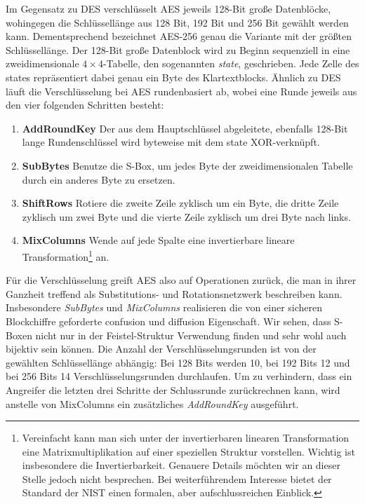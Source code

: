 Im Gegensatz zu DES verschlüsselt AES jeweils 128-Bit große Datenblöcke,
wohingegen die Schlüssellänge aus 128 Bit, 192 Bit und 256 Bit gewählt
werden kann. Dementsprechend bezeichnet AES-256 genau die Variante mit
der größten Schlüssellänge. Der 128-Bit große Datenblock wird zu Beginn
sequenziell in eine zweidimensionale $4 \times 4$-Tabelle, den
sogenannten \emph{state}, geschrieben. Jede Zelle des states
repräsentiert dabei genau ein Byte des Klartextblocks. Ähnlich zu DES
läuft die Verschlüsselung bei AES rundenbasiert ab, wobei eine Runde
jeweils aus den vier folgenden Schritten besteht:

\begin{enumerate}
  \small
\item \textbf{AddRoundKey} Der aus dem Hauptschlüssel abgeleitete,
  ebenfalls 128-Bit lange Rundenschlüssel wird byteweise mit dem state
  XOR-verknüpft. 
\item \textbf{SubBytes} Benutze die S-Box, um jedes Byte der
  zweidimensionalen Tabelle durch ein anderes Byte zu ersetzen. 
\item \textbf{ShiftRows} Rotiere die zweite Zeile zyklisch um ein Byte,
  die dritte Zeile zyklisch um zwei Byte und die vierte Zeile zyklisch
  um drei Byte nach links. 
\item \textbf{MixColumns} Wende auf jede Spalte eine invertierbare
  lineare Transformation\footnote{Vereinfacht kann man sich unter der
    invertierbaren linearen Transformation eine Matrixmultiplikation auf
    einer speziellen Struktur vorstellen. Wichtig ist insbesondere die
    Invertierbarkeit. Genauere Details möchten wir an dieser Stelle
    jedoch nicht besprechen. Bei weiterführendem Interesse bietet der
    Standard der NIST \cite{NIST_AES01} einen formalen, aber
    aufschlussreichen Einblick.} an. 
\end{enumerate}

Für die Verschlüsselung greift AES also auf Operationen zurück, die man
in ihrer Ganzheit treffend als Substitutions- und Rotationsnetzwerk
beschreiben kann. Insbesondere \textit{SubBytes} und \textit{MixColumns}
realisieren die von einer sicheren Blockchiffre geforderte confusion und
diffusion Eigenschaft. Wir sehen, dass S-Boxen \indexSBOX nicht nur in
der Feistel-Struktur Verwendung finden und sehr wohl auch bijektiv sein
können. 
Die Anzahl der Verschlüsselungsrunden ist von der gewählten
Schlüssellänge abhängig: Bei 128 Bits werden 10, bei 192 Bits 12 und bei
256 Bits 14 Verschlüsselungsrunden durchlaufen. Um zu verhindern, dass
ein Angreifer die letzten drei Schritte der Schlussrunde zurückrechnen
kann, wird anstelle von MixColumns ein zusätzliches \textit{AddRoundKey}
ausgeführt. 

